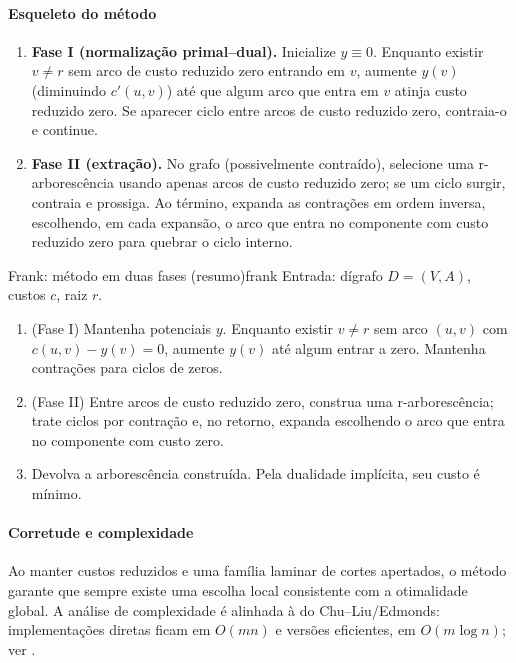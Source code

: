 \documentclass[12pt,a4paper]{article}
\begin{document}
\paragraph{Esqueleto do método}
\begin{enumerate}\setlength{\itemsep}{2pt}
    \item \textbf{Fase I (normalização primal–dual).} Inicialize \(y\equiv 0\). Enquanto existir \(v\neq r\) sem arco de custo reduzido zero entrando em \(v\), aumente \(y(v)\) (diminuindo \(c'(u,v)\)) até que algum arco que entra em \(v\) atinja custo reduzido zero. Se aparecer ciclo entre arcos de custo reduzido zero, contraia-o e continue.
    \item \textbf{Fase II (extração).} No grafo (possivelmente contraído), selecione uma r-arborescência usando apenas arcos de custo reduzido zero; se um ciclo surgir, contraia e prossiga. Ao término, expanda as contrações em ordem inversa, escolhendo, em cada expansão, o arco que entra no componente com custo reduzido zero para quebrar o ciclo interno.
\end{enumerate}

\begin{algobox}{Frank: método em duas fases (resumo)}{frank}
Entrada: dígrafo \(D=(V,A)\), custos \(c\), raiz \(r\).
\begin{enumerate}\setlength{\itemsep}{2pt}
    \item (Fase I) Mantenha potenciais \(y\). Enquanto existir \(v\neq r\) sem arco \((u,v)\) com \(c(u,v)-y(v)=0\), aumente \(y(v)\) até algum entrar a zero. Mantenha contrações para ciclos de zeros.
    \item (Fase II) Entre arcos de custo reduzido zero, construa uma r-arborescência; trate ciclos por contração e, no retorno, expanda escolhendo o arco que entra no componente com custo zero.
    \item Devolva a arborescência construída. Pela dualidade implícita, seu custo é mínimo.
\end{enumerate}
\end{algobox}

\paragraph{Corretude e complexidade}
Ao manter custos reduzidos e uma família laminar de cortes apertados, o método garante que sempre existe uma escolha local consistente com a otimalidade global. A análise de complexidade é alinhada à do Chu–Liu/Edmonds: implementações diretas ficam em \(O(mn)\) e versões eficientes, em \(O(m\log n)\); ver \cite{frank2014,schrijver2003comb}.
\end{document}
